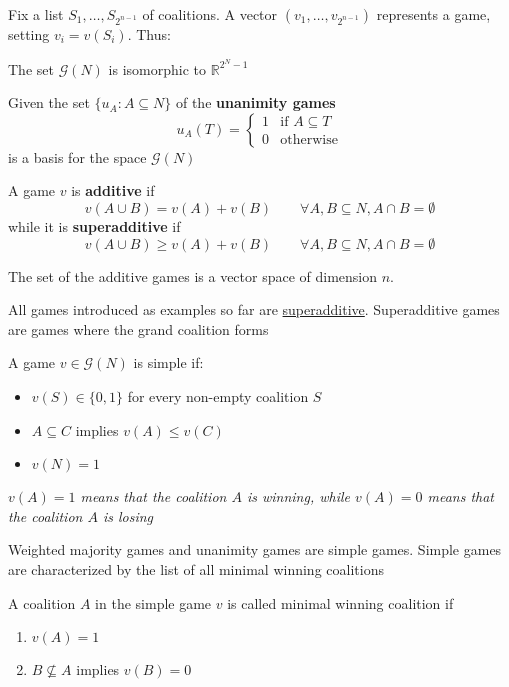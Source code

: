 \documentclass[../main.tex]{subfiles}
\begin{document}
Fix a list $S_1,\ldots,S_{2^{n-1}}$ of coalitions. A vector $(v_1,\ldots,v_{2^{n-1}})$ represents a game, setting $v_i = v(S_i)$. Thus:
\begin{proposition}
    The set $\mathcal{G}(N)$ is isomorphic to $\mathbb{R}^{2^N - 1}$
\end{proposition}
\begin{proposition}
    Given the set $\{u_A : A\subseteq N\}$ of the \textbf{unanimity games}
    \[
        u_A(T) =
        \begin{cases}
            1 & \text{if } A \subseteq T \\
            0 & \text{otherwise}
        \end{cases}
    \]
    is a basis for the space $\mathcal{G}(N)$
\end{proposition}
\begin{definition}
    A game $v$ is \textbf{additive} if
    \[
        v(A \cup B) = v(A) + v(B) \qquad \forall A,B \subseteq N, A \cap B = \emptyset
    \]
    while it is \textbf{superadditive} if
    \[
        v(A \cup B) \geq v(A) + v(B) \qquad \forall A,B \subseteq N, A \cap B = \emptyset
    \]
\end{definition}
\begin{note}
    The set of the additive games is a vector space of dimension $n$.
\end{note}
All games introduced as examples so far are \underline{superadditive}. Superadditive games are games where the grand coalition forms
\begin{definition}
    A game $v \in \mathcal{G}(N)$ is simple if:
    \begin{itemize}
        \item $v(S) \in \{0,1\}$ for every non-empty coalition $S$
        \item $A \subseteq C$ implies $v(A) \leq v(C)$
        \item $v(N) = 1$
    \end{itemize}
    \textit{$v(A) = 1$ means that the coalition $A$ is winning, while $v(A) = 0$ means that the coalition $A$ is losing}
\end{definition}
Weighted majority games and unanimity games are simple games. Simple games are characterized by the list of all minimal winning coalitions
\begin{definition}
    A  coalition $A$ in the simple game $v$ is called minimal winning coalition if
    \begin{enumerate}
        \item $v(A) = 1$
        \item $B \nsubseteq A$ implies $v(B) = 0$
    \end{enumerate}
\end{definition}
\end{document}
